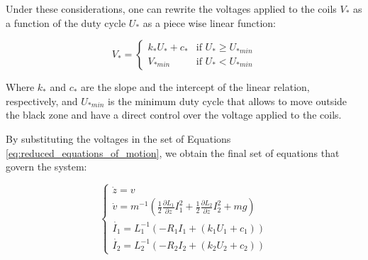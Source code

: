 Under these considerations, one can rewrite the voltages applied to the coils $V_{*}$ as a function of the duty cycle $U_{*}$ as a piece wise linear function:

\begin{equation}
    V_{*} =
    \begin{cases}
        k_{*} U_{*} + c_{*} & \text{if } U_{*} \geq U_{*min} \\
        V_{*min}            & \text{if } U_{*} < U_{*min}
    \end{cases}
    \label{eq:voltage_duty_cycle_relation}
\end{equation}

Where $k_{*}$ and $c_{*}$ are the slope and the intercept of the linear relation, respectively, and $U_{*min}$ is the minimum duty cycle that allows to move outside the black zone and have a direct control over the voltage applied to the coils.

By substituting the voltages in the set of Equations \ref{eq:reduced_equations_of_motion}, we obtain the final set of equations that govern the system:

\begin{equation}
    \begin{cases}
        \dot{z} = v                                                                                                                                 \\
        \dot{v} = m^{-1} \left(\frac{1}{2} \frac{\partial L_1}{\partial z} I_1^2 + \frac{1}{2} \frac{\partial L_2}{\partial z} I_2^2 + m g  \right) \\
        \dot{I_1} = L_1^{-1} \left(- R_1 I_1 + (k_1 U_1 + c_1) \right)                                                                              \\
        \dot{I_2} = L_2^{-1} \left(- R_2 I_2 + (k_2 U_2 + c_2) \right)
    \end{cases}
    \label{eq:reduced_equations_of_motion_final}
\end{equation}
